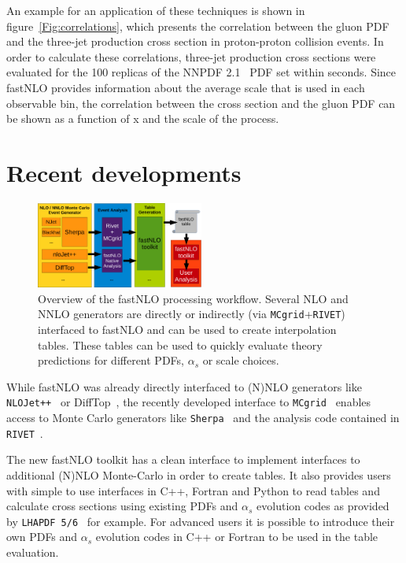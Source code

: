 \documentclass{PoS}
\begin{document}
An example for an application of these techniques is shown in figure~\ref{Fig:correlations},
which presents the correlation between the gluon PDF and the three-jet production
cross section in proton-proton collision events.
In order to calculate these correlations, three-jet production cross sections
were evaluated for the 100 replicas of the NNPDF 2.1~\cite{Ball:2011uy}
PDF set within seconds. Since fastNLO provides information about the average
scale that is used in each observable bin, the correlation
between the cross section and the gluon PDF can be shown as a function
of x and the scale of the process.

\newpage
\section{Recent developments}

\begin{figure}
  \centering
  \includegraphics[width=0.49\textwidth]{interface-crop}
  \caption{Overview of the fastNLO processing workflow. Several
    NLO and NNLO generators are directly or indirectly (via \texttt{MCgrid}+\texttt{RIVET})
    interfaced to fastNLO and can be used to create interpolation tables.
    These tables can be used to quickly evaluate theory predictions
    for different PDFs, $\alpha_s$ or scale choices.}
  \label{Fig:interface}
\end{figure}

While fastNLO was already directly interfaced to (N)NLO generators
like \texttt{NLOJet++}~\cite{Nagy:1998bb,Nagy:2001xb,Nagy:2003tz} or DiffTop~\cite{Guzzi:2014wia},
the recently developed interface to \texttt{MCgrid}~\cite{DelDebbio:2013kxa}
enables access to Monte Carlo generators like \texttt{Sherpa}~\cite{Gleisberg:2008ta}
and the analysis code contained in \texttt{RIVET}~\cite{Buckley:2010ar}.

The new fastNLO toolkit has a clean interface to implement interfaces
to additional (N)NLO Monte-Carlo in order to create tables.
It also provides users with simple to use interfaces in C++, Fortran
and Python to read tables and calculate cross sections using existing
PDFs and $\alpha_s$ evolution codes as provided by
\texttt{LHAPDF 5/6}~\cite{Buckley:2014ana,Bourilkov:2006cj} for example.
For advanced users it is possible to introduce their own PDFs and
$\alpha_s$ evolution codes in C++ or Fortran to be used in the table evaluation.
\end{document}
